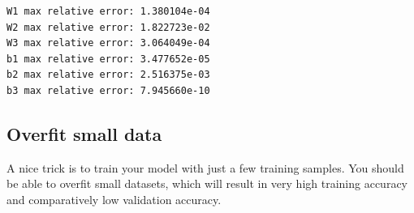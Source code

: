 \documentclass[11pt]{article}
\begin{document}
    \begin{Verbatim}[commandchars=\\\{\}]
W1 max relative error: 1.380104e-04
W2 max relative error: 1.822723e-02
W3 max relative error: 3.064049e-04
b1 max relative error: 3.477652e-05
b2 max relative error: 2.516375e-03
b3 max relative error: 7.945660e-10

    \end{Verbatim}

    \subsection{Overfit small data}\label{overfit-small-data}

A nice trick is to train your model with just a few training samples.
You should be able to overfit small datasets, which will result in very
high training accuracy and comparatively low validation accuracy.
\end{document}
